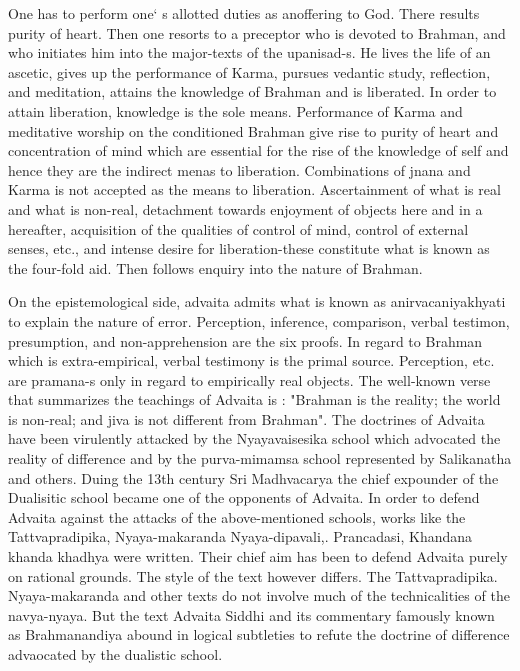 One has to perform one` s allotted duties as anoffering to God. There results purity of heart. Then one resorts to a preceptor who is devoted to Brahman, and who initiates him into the major-texts of the upanisad-s. He lives the life of an ascetic, gives up the performance of Karma, pursues vedantic study, reflection, and meditation, attains the knowledge of Brahman and is liberated. In order to attain liberation, knowledge is the sole means. Performance of Karma and meditative worship on the conditioned Brahman give rise to purity of heart and concentration of mind which are essential for the rise of the knowledge of self and hence they are the indirect menas to liberation. Combinations of jnana and Karma is not accepted as the means to liberation. Ascertainment of what is real and what is non-real, detachment towards enjoyment of objects here and in a hereafter, acquisition of the qualities of control of mind, control of external senses, etc., and intense desire for liberation-these constitute what is known as the four-fold aid. Then follows enquiry into the nature of Brahman.

On the epistemological side, advaita admits what is known as anirvacaniyakhyati to explain the nature of error. Perception, inference, comparison, verbal testimon, presumption, and non-apprehension are the six proofs. In regard to Brahman which is extra-empirical, verbal testimony is the primal source. Perception, etc. are pramana-s only in regard to empirically real objects. The well-known verse that summarizes the teachings of Advaita is : "Brahman is the reality; the world is non-real; and jiva is not different from Brahman".
The doctrines of Advaita have been virulently attacked by the Nyayavaisesika school which advocated the reality of difference and by the purva-mimamsa school represented by Salikanatha and others. Duing the 13th century Sri Madhvacarya the chief expounder of the Dualisitic school became one of the opponents of Advaita. In order to defend Advaita against the attacks of the above-mentioned schools, works like the Tattvapradipika, Nyaya-makaranda Nyaya-dipavali,. Prancadasi, Khandana khanda khadhya were written. Their chief aim has been to defend Advaita purely on rational grounds. The style of the text however differs. The Tattvapradipika. Nyaya-makaranda and other texts do not involve much of the technicalities of the navya-nyaya. But the text Advaita Siddhi and its commentary famously known as Brahmanandiya abound in logical subtleties to refute the doctrine of difference advaocated by the dualistic school. 

